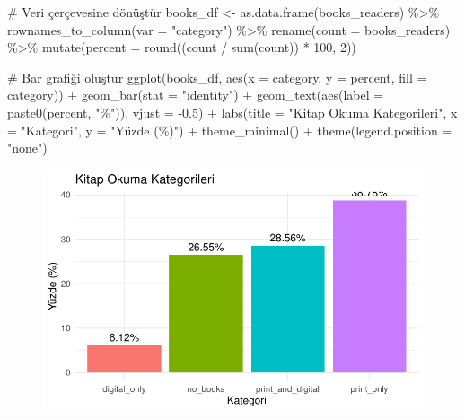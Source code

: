 \documentclass[
  letterpaper,
  DIV=11,
  numbers=noendperiod]{scrartcl}
\newenvironment{Shaded}{\begin{snugshade}}{\end{snugshade}}
\newcommand{\AttributeTok}[1]{\textcolor[rgb]{0.40,0.45,0.13}{#1}}
\newcommand{\CommentTok}[1]{\textcolor[rgb]{0.37,0.37,0.37}{#1}}
\newcommand{\DecValTok}[1]{\textcolor[rgb]{0.68,0.00,0.00}{#1}}
\newcommand{\FloatTok}[1]{\textcolor[rgb]{0.68,0.00,0.00}{#1}}
\newcommand{\FunctionTok}[1]{\textcolor[rgb]{0.28,0.35,0.67}{#1}}
\newcommand{\NormalTok}[1]{\textcolor[rgb]{0.00,0.23,0.31}{#1}}
\newcommand{\OtherTok}[1]{\textcolor[rgb]{0.00,0.23,0.31}{#1}}
\newcommand{\SpecialCharTok}[1]{\textcolor[rgb]{0.37,0.37,0.37}{#1}}
\newcommand{\StringTok}[1]{\textcolor[rgb]{0.13,0.47,0.30}{#1}}
\begin{document}
\begin{Shaded}
\begin{Highlighting}[]
\CommentTok{\# Veri çerçevesine dönüştür}
\NormalTok{books\_df }\OtherTok{\textless{}{-}} \FunctionTok{as.data.frame}\NormalTok{(books\_readers) }\SpecialCharTok{\%\textgreater{}\%}
  \FunctionTok{rownames\_to\_column}\NormalTok{(}\AttributeTok{var =} \StringTok{"category"}\NormalTok{) }\SpecialCharTok{\%\textgreater{}\%}
  \FunctionTok{rename}\NormalTok{(}\AttributeTok{count =}\NormalTok{ books\_readers) }\SpecialCharTok{\%\textgreater{}\%}
  \FunctionTok{mutate}\NormalTok{(}\AttributeTok{percent =} \FunctionTok{round}\NormalTok{((count }\SpecialCharTok{/} \FunctionTok{sum}\NormalTok{(count)) }\SpecialCharTok{*} \DecValTok{100}\NormalTok{, }\DecValTok{2}\NormalTok{))}

\CommentTok{\# Bar grafiği oluştur}
\FunctionTok{ggplot}\NormalTok{(books\_df, }\FunctionTok{aes}\NormalTok{(}\AttributeTok{x =}\NormalTok{ category, }\AttributeTok{y =}\NormalTok{ percent, }\AttributeTok{fill =}\NormalTok{ category)) }\SpecialCharTok{+}
  \FunctionTok{geom\_bar}\NormalTok{(}\AttributeTok{stat =} \StringTok{"identity"}\NormalTok{) }\SpecialCharTok{+}
  \FunctionTok{geom\_text}\NormalTok{(}\FunctionTok{aes}\NormalTok{(}\AttributeTok{label =} \FunctionTok{paste0}\NormalTok{(percent, }\StringTok{"\%"}\NormalTok{)), }\AttributeTok{vjust =} \SpecialCharTok{{-}}\FloatTok{0.5}\NormalTok{) }\SpecialCharTok{+}
  \FunctionTok{labs}\NormalTok{(}\AttributeTok{title =} \StringTok{"Kitap Okuma Kategorileri"}\NormalTok{,}
       \AttributeTok{x =} \StringTok{"Kategori"}\NormalTok{,}
       \AttributeTok{y =} \StringTok{"Yüzde (\%)"}\NormalTok{) }\SpecialCharTok{+}
  \FunctionTok{theme\_minimal}\NormalTok{() }\SpecialCharTok{+}
  \FunctionTok{theme}\NormalTok{(}\AttributeTok{legend.position =} \StringTok{"none"}\NormalTok{)}
\end{Highlighting}
\end{Shaded}

\begin{figure}[H]

{\centering \includegraphics{4_hafta_tanimlayici_istatistik_files/figure-pdf/unnamed-chunk-3-1.pdf}

}

\end{figure}
\end{document}

